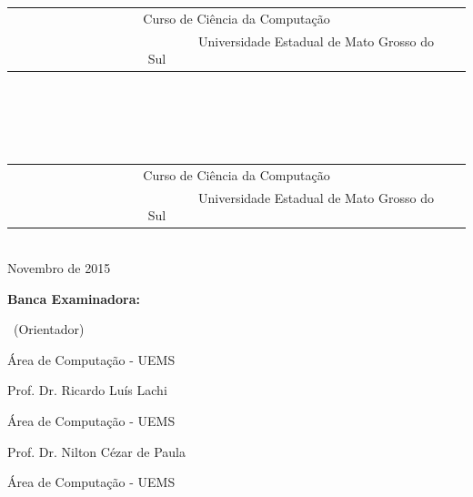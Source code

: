 \documentclass[
	12pt,				%
	openright,			%
	twoside,			%
	a4paper,			%
	chapter=TITLE,		%
	english,			%
	brazil				%
	]{abntex2}
\makeatletter
\renewcommand{\imprimircapa}{%
\begin{capa}%
	\center
	

	\begin{tabular}{@{}c@{}}
          \toprule
          Curso de Ciência da Computação            \\
          \ \ \ \ \ \ \ \ \ \ \ \ \ \ \ \ \ \ \ \ \ \ \ \ \ Universidade Estadual de Mato Grosso do Sul\ \ \ \ \ \ \ \ \ \ \ \ \ \ \ \ \ \ \ \ \ \ \ \ \  \\ \bottomrule
          \end{tabular}

	
	
	
	\vspace*{\fill}
	\begin{center}
		\ABNTEXchapterfont\bfseries\LARGE\imprimirtitulo
	\end{center}

	\vspace*{\fill} 
	{\large \imprimirautor}
	\\
	\vspace*{\fill}
	\imprimirorientador
	\\
	\vspace*{7cm}
		
	\large\imprimirlocal \\
	\large\imprimirdata
	\vspace*{1cm}
	
\end{capa}
}
\makeatother
\begin{document}

\frenchspacing 


\imprimircapa %


\begin{folhadeaprovacao}
        \begin{center}
          \center
          \begin{tabular}{@{}c@{}}
          \toprule
          Curso de Ciência da Computação            \\
          \ \ \ \ \ \ \ \ \ \ \ \ \ \ \ \ \ \ \ \ \ \ \ \ \ Universidade Estadual de Mato Grosso do Sul\ \ \ \ \ \ \ \ \ \ \ \ \ \ \ \ \ \ \ \ \ \ \ \ \  \\ \bottomrule
          \end{tabular}
          \vspace*{1cm}
          \begin{center}
              \ABNTEXchapterfont\bfseries\LARGE\imprimirtitulo
          \end{center}
          \vspace*{1cm}
          {\large \imprimirautor}
          \\
          \vspace*{1cm}
          Novembro de 2015
          \vspace*{\fill}
        \end{center}

          \textbf{Banca Examinadora:}

          \imprimirorientador \  (Orientador)

          Área de Computação - UEMS
          \vspace*{0.5cm}

          Prof. Dr. Ricardo Luís Lachi

          Área de Computação - UEMS
          \vspace*{0.5cm}

          Prof. Dr. Nilton Cézar de Paula

          Área de Computação - UEMS
    \end{folhadeaprovacao}

\imprimirfolhaderosto*
\end{document}
